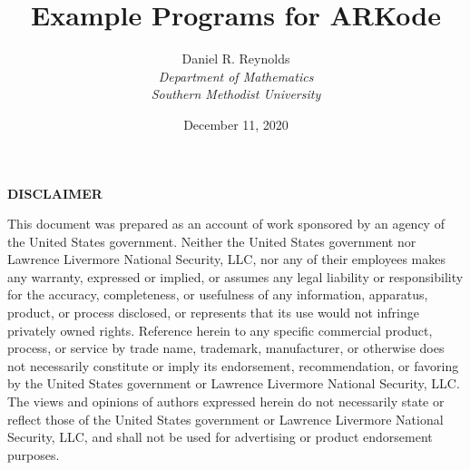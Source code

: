 \documentclass[letterpaper,10pt,english]{sphinxmanual}
\title{Example Programs for ARKode}
\date{December 11, 2020}
\author{
    Daniel R. Reynolds\\
    {\em Department of Mathematics} \\
    {\em Southern Methodist University}
    }
\newcommand{\sunreleasename}{v5.6.0}
\renewcommand{\releasename}{v4.6.0}
\begin{document}

\makeatletter



\makeatother

\clearpage

\thispagestyle{empty}%
\baselineskip
\begin{center}
  {\bf DISCLAIMER}
\end{center}
\noindent
This document was prepared as an account of work sponsored by an agency of
the United States government. Neither the United States government nor
Lawrence Livermore National Security, LLC, nor any of their employees makes
any warranty, expressed or implied, or assumes any legal liability or responsibility
for the accuracy, completeness, or usefulness of any information, apparatus, product,
or process disclosed, or represents that its use would not infringe privately owned rights.
Reference herein to any specific commercial product, process, or service by trade name,
trademark, manufacturer, or otherwise does not necessarily constitute or imply its endorsement,
recommendation, or favoring by the United States government or Lawrence Livermore National
Security, LLC. The views and opinions of authors expressed herein do not necessarily state
or reflect those of the United States government or Lawrence Livermore National Security, LLC,
and shall not be used for advertising or product endorsement purposes.
\end{document}
